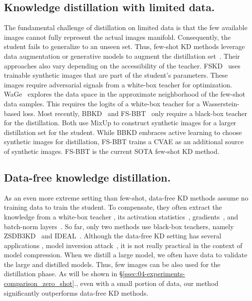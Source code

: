 \subsection{Knowledge distillation with limited data.}
\begin{foldable}
  The fundamental challenge of distillation on limited data is that the few available images cannot fully represent the actual images manifold.
  Consequently, the student fails to generalize to an unseen set.
  Thus, few-shot KD methods leverage data augmentation or generative models to augment the distillation set~\cite{kimura2018few,kong2020learning,wang2020neural,nguyen2022black}.
  Their approaches also vary depending on the accessibility of the teacher.
  FSKD~\cite{kimura2018few} uses trainable synthetic images that are part of the student's parameters.
  These images require adversarial signals from a white-box teacher for optimization.
  WaGe~\cite{kong2020learning} explores the data space in the approximate neighborhood of the few-shot data samples.
  This requires the logits of a white-box teacher for a Wasserstein-based loss.
  Most recently, BBKD~\cite{wang2020neural} and FS-BBT~\cite{nguyen2022black} only require a black-box teacher for the distillation.
  Both use MixUp to construct synthetic images for a larger distillation set for the student.
  While BBKD embraces active learning to choose synthetic images for distillation, FS-BBT trains a CVAE as an additional source of synthetic images.
  FS-BBT is the current SOTA few-shot KD method.
\end{foldable}

\subsection{Data-free knowledge distillation.}
\begin{foldable}
  As an even more extreme setting than few-shot, data-free KD methods assume no training data to train the student.
  To compensate, they often extract the knowledge from a white-box teacher \eg, its activation statistics~\cite{lopes2017data}, gradients~\cite{nayak2019zero,chen2019data}, and batch-norm layers~\cite{yin2020dreaming}.
  So far, only two methods use black-box teachers, namely ZSDB3KD~\cite{wang2021zero} and IDEAL~\cite{zhang2022ideal}.
  Although the data-free KD setting has several applications \eg, model inversion attack~\cite{zhang2020secret}, it is not really practical in the context of model compression.
  When we distill a large model, we often have data to validate the large and distilled models.
  Thus, few images can be also used for the distillation phase.
  As will be shown in \S\ref{ssec:04-experiments-comparison_zero_shot}., even with a small portion of data, our method significantly outperforms data-free KD methods.
\end{foldable}

